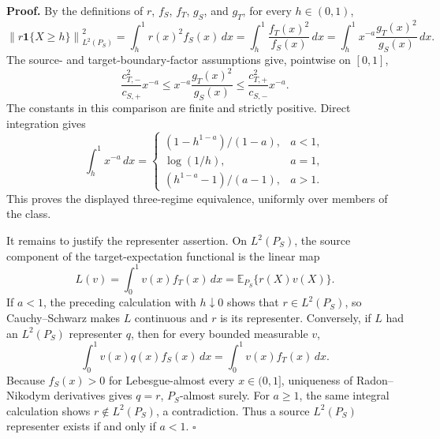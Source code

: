 \textbf{Proof.}
By the definitions of \(r\), \(f_S\), \(f_T\), \(g_S\), and \(g_T\), for every \(h\in(0,1)\),
\[
 \left\|r\mathbf 1\{X\ge h\}\right\|_{L^2(P_S)}^2
 =\int_h^1 r(x)^2 f_S(x)\,dx
 =\int_h^1 \frac{f_T(x)^2}{f_S(x)}\,dx
 =\int_h^1 x^{-a}\frac{g_T(x)^2}{g_S(x)}\,dx.
\]
The source- and target-boundary-factor assumptions give, pointwise on \([0,1]\),
\[
 \frac{c_{T,-}^2}{c_{S,+}}x^{-a}
 \le x^{-a}\frac{g_T(x)^2}{g_S(x)}
 \le \frac{c_{T,+}^2}{c_{S,-}}x^{-a}.
\]
The constants in this comparison are finite and strictly positive.  Direct integration gives
\[
 \int_h^1x^{-a}\,dx=
 \begin{cases}
 (1-h^{1-a})/(1-a),&a<1,\\
 \log(1/h),&a=1,\\
 (h^{1-a}-1)/(a-1),&a>1.
 \end{cases}
\]
This proves the displayed three-regime equivalence, uniformly over members of the class.

It remains to justify the representer assertion.  On \(L^2(P_S)\), the source component of the target-expectation functional is the linear map
\[
 L(v)=\int_0^1v(x)f_T(x)\,dx=\mathbb E_{P_S}\{r(X)v(X)\}.
\]
If \(a<1\), the preceding calculation with \(h\downarrow0\) shows that \(r\in L^2(P_S)\), so Cauchy--Schwarz makes \(L\) continuous and \(r\) is its representer.  Conversely, if \(L\) had an \(L^2(P_S)\) representer \(q\), then for every bounded measurable \(v\),
\[
 \int_0^1v(x)q(x)f_S(x)\,dx=\int_0^1v(x)f_T(x)\,dx.
\]
Because \(f_S(x)>0\) for Lebesgue-almost every \(x\in(0,1]\), uniqueness of Radon--Nikodym derivatives gives \(q=r\), \(P_S\)-almost surely.  For \(a\ge1\), the same integral calculation shows \(r\notin L^2(P_S)\), a contradiction.  Thus a source \(L^2(P_S)\) representer exists if and only if \(a<1\). \(\square\)